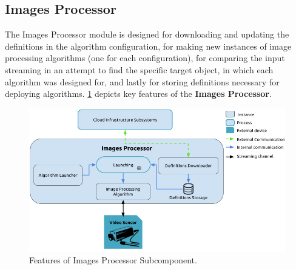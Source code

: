 \subsection{Images Processor}
% 
% 
%
%
The Images Processor module is designed for downloading and updating the definitions in the algorithm configuration, for making new instances of image processing algorithms (one for each configuration), for comparing the input streaming in an attempt to find the specific target object, in which each algorithm was designed for, and lastly for storing definitions necessary for deploying algorithms. \ref{fig:buscab} depicts key features of the \textbf{Images Processor}.

\begin{figure}[htb!]
 	\centering
 	\includegraphics[scale=0.60]{Imagens/cap4_img_proc.png}
 	\caption{Features of Images Processor Subcomponent.}    
 	\label{fig:buscab}
\end{figure}


